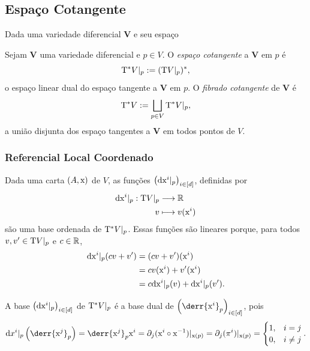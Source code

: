 \subsection{Espaço Cotangente}

Dada uma variedade diferencial $\bm V$ e seu espaço
\begin{defi}
Sejam $\bm V$ uma variedade diferencial e $p \in V$. O \emph{espaço cotangente} a $\bm V$ em $p$ é
	\begin{equation*}
	\mathrm{T}^* V|_p := (\mathrm{T} V|_p)^*,
	\end{equation*}
o espaço linear dual do espaço tangente a $\bm V$ em $p$. O \emph{fibrado cotangente} de $\bm V$ é
	\begin{equation*}
	\mathrm{T}^* V := \bigsqcup_{p \in V} \mathrm{T}^* V|_p,
	\end{equation*}
a união disjunta dos espaço tangentes a $\bm V$ em todos pontos de $V$.
\end{defi}

\subsubsection{Referencial Local Coordenado}

Dada uma carta $(A,\mathrm{x})$ de $V$, as funções $\left( \mathrm{d} \mathrm{x}^i|_p \right)_{i \in [d]}$, definidas por
	\begin{align*}
	{\mathrm{d}\mathrm{x}^i|_p}: {\mathrm{T} V|_p} &\longrightarrow {\mathbb{R}} \\{v} &\longmapsto {v(\mathrm{x}^i)}
	\end{align*}
são uma base ordenada de $\mathrm{T}^* V|_p$. Essas funções são lineares porque, para todos $v,v' \in \mathrm{T} V|_p$ e $c \in \mathbb{R}$,
	\begin{align*}
	\mathrm{d} \mathrm{x}^i|_p(cv+v') &= (cv+v')(\mathrm{x}^i) \\
		&= cv(\mathrm{x}^i) + v'(\mathrm{x}^i) \\
		&= c\mathrm{d} \mathrm{x}^i|_p(v) + \mathrm{d} \mathrm{x}^i|_p(v').
	\end{align*}

A base $\left( \mathrm{d} \mathrm{x}^i|_p \right)_{i \in [d]}$ de $\mathrm{T}^* V|_p$ é a base dual de $\left( \derr{\x^i}_{p} \right)_{i \in [d]}$, pois
	\begin{equation*}
	\dd x^i|_p\left(\derr{\x^j}_{p}\right) = \derr{\x^j}_{p}\x^i = \partial_j(\x^i \circ \x\inv)|_{\x(p)} = \partial_j(\pi^i)|_{\x(p)} = 
		\begin{cases}
			1,& i=j \\
			0,& i \neq j
		\end{cases}.
	\end{equation*}





